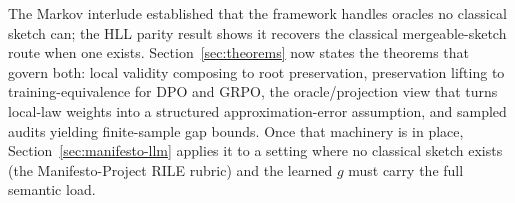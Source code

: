 The Markov interlude established that the framework handles oracles no
classical sketch can; the HLL parity result shows it recovers the classical
mergeable-sketch route when one exists. Section~\ref{sec:theorems} now states the
theorems that govern both: local validity composing to root
preservation, preservation lifting to training-equivalence for DPO and
GRPO, the oracle/projection view that turns local-law weights into a
structured approximation-error assumption, and sampled audits yielding
finite-sample gap bounds. Once that
machinery is in place, Section~\ref{sec:manifesto-llm} applies it to a
setting where no classical sketch exists (the Manifesto-Project RILE
rubric) and the learned $g$ must carry the full semantic load.

